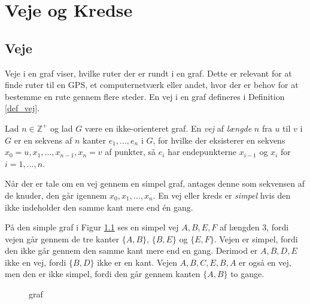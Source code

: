 \chapter{Veje og Kredse}


\section{Veje}
Veje i en graf viser, hvilke ruter der er rundt i en graf. Dette er relevant for at finde ruter til en GPS, et computernetværk eller andet, hvor der er behov for at bestemme en rute gennem flere steder. 
En vej i en graf defineres i Definition \ref{def_vej}.

\begin{defn}
\label{def_vej}
Lad $n \in  \mathbb{Z}^{+}$ og lad $G$ være en ikke-orienteret graf. 
En \textit{vej} af \textit{længde} $n$ fra $u$ til $v$ i $G$ er en sekvens af $n$ kanter $e_1, ..., e_n$ i $G$, for hvilke der eksisterer en sekvens $x_0=u,x_1,...,x_{n-1},x_n=v$ af punkter, så $e_i$ har endepunkterne $x_{i-1}$ og $x_i$ for $i=1,...,n$.
\end{defn}

\noindent Når der er tale om en vej gennem en simpel graf, antages denne som sekvensen af de knuder, den går igennem $x_0, x_1,...,x_n$. 
En vej eller kreds er \textit{simpel} hvis den ikke indeholder den samme kant mere end én gang. 

\begin{exmp}
\label{ex_vej}
På den simple graf i Figur \ref{graf_vej} ses en simpel vej $A,B,E,F$ af længden 3, fordi vejen går gennem de tre kanter $\lbrace A,B \rbrace$, $\lbrace B,E \rbrace$ og $\lbrace E,F \rbrace$. 
Vejen er simpel, fordi den ikke går gennem den samme kant mere end en gang. 
Derimod er $A,B,D,E$ ikke en vej, fordi $\lbrace B,D \rbrace$ ikke er en kant. 
Vejen $A,B,C,E,B,A$ er også en vej, men den er ikke simpel, fordi den går gennem kanten $\lbrace A,B \rbrace$ to gange. 
\end{exmp}

\begin{figure}[h]
\centering
{}
\caption{graf} 
\label{graf_vej}
\end{figure}

